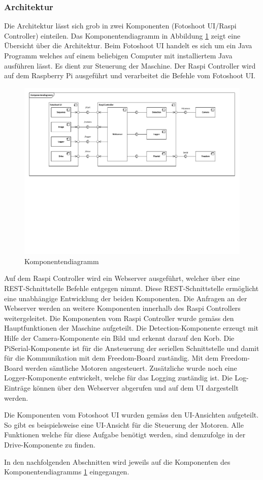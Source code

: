 \subsubsection{Architektur}

Die Architektur lässt sich grob in zwei Komponenten (Fotoshoot UI/Raspi Controller) einteilen. Das Komponentendiagramm in Abbildung \ref{fig:komponentendiagramm} zeigt eine Übersicht über die Architektur. Beim Fotoshoot UI handelt es sich um ein Java Programm welches auf einem beliebigen Computer mit installiertem Java ausführen lässt. Es dient zur Steuerung der Maschine. Der Raspi Controller wird auf dem Raspberry Pi ausgeführt und verarbeitet die Befehle vom Fotoshoot UI.

\begin{figure}[h!]
	\centering
	\includegraphics[width=\linewidth]{../../fig/komponentendiagramm}
	\caption{Komponentendiagramm}
	\label{fig:komponentendiagramm}
\end{figure}

Auf dem Raspi Controller wird ein Webserver ausgeführt, welcher über eine REST-Schnittstelle Befehle entgegen nimmt. Diese REST-Schnittstelle ermöglicht eine unabhängige Entwicklung der beiden Komponenten. Die Anfragen an der Webserver werden an weitere Komponenten innerhalb des Raspi Controllers weitergeleitet. Die Komponenten vom Raspi Controller wurde gemäss den Hauptfunktionen der Maschine aufgeteilt. Die Detection-Komponente erzeugt mit Hilfe der Camera-Komponente ein Bild und erkennt darauf den Korb. Die PiSerial-Komponente ist für die Ansteuerung der seriellen Schnittstelle und damit für die Kommunikation mit dem Freedom-Board zuständig. Mit dem Freedom-Board werden sämtliche Motoren angesteuert. Zusätzliche wurde noch eine Logger-Komponente entwickelt, welche für das Logging zuständig ist. Die Log-Einträge können über den Webserver abgerufen und auf dem UI dargestellt werden.

Die Komponenten vom Fotoshoot UI wurden gemäss den UI-Ansichten aufgeteilt. So gibt es beispielsweise eine UI-Ansicht für die Steuerung der Motoren. Alle Funktionen welche für diese Aufgabe benötigt werden, sind demzufolge in der Drive-Komponente zu finden.

In den nachfolgenden Abschnitten wird jeweils auf die Komponenten des Komponentendiagramms \ref{fig:komponentendiagramm} eingegangen.